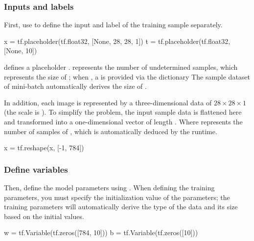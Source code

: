 \begin{content}
\begin{content}
\subsubsection{Inputs and labels}
First, use  to define the input and label of the training sample separately.

\begin{leftbar}
\begin{python}
x = tf.placeholder(tf.float32, [None, 28, 28, 1])
t = tf.placeholder(tf.float32, [None, 10])
\end{python}
\end{leftbar}

 defines a placeholder .  represents the number of undetermined samples, which represents the size of ; when , a \ascii is provided via the  dictionary The sample dataset of {mini-batch} automatically derives the size of .

In addition, each image is represented by a three-dimensional data of $ 28 \times 28 \times 1 $ (the scale is ). To simplify the problem, the input sample data is flattened here and transformed into a one-dimensional vector of length . Where  represents the number of samples of , which is automatically deduced by the runtime.

\begin{leftbar}
\begin{python}
x = tf.reshape(x, [-1, 784])
\end{python}
\end{leftbar}


\subsubsection{Define variables}
Then, define the model parameters using . When defining the training parameters, you must specify the initialization value of the parameters; the training parameters will automatically derive the type of the data and its size based on the initial values.

\begin{leftbar}
\begin{python}
w = tf.Variable(tf.zeros([784, 10]))
b = tf.Variable(tf.zeros([10]))
\end{python}
\end{leftbar}


\end{content}
\end{content}
